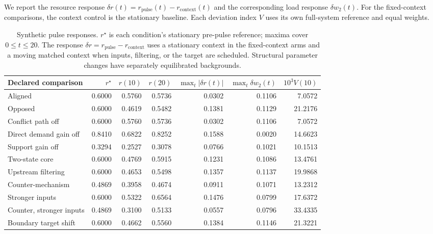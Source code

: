 We report the resource response $\delta r(t)=r_{\mathrm{pulse}}(t)-r_{\mathrm{context}}(t)$ and the corresponding load response $\delta w_2(t)$. For the fixed-context comparisons, the context control is the stationary baseline. Each deviation index $V$ uses its own full-system reference and equal weights.

\begin{table}[H]\centering\footnotesize

\begin{tabularx}{\textwidth}{@{}Yrrrrrr@{}}\toprule

Declared comparison & $r^\star$ & $r(10)$ & $r(20)$ & $\max_t|\delta r(t)|$ & $\max_t\delta w_2(t)$ & $10^3 V(10)$ \\\midrule

Aligned & 0.6000 & 0.5760 & 0.5736 & 0.0302 & 0.1106 & 7.0572 \\

Opposed & 0.6000 & 0.4619 & 0.5482 & 0.1381 & 0.1129 & 21.2176 \\

Conflict path off & 0.6000 & 0.5760 & 0.5736 & 0.0302 & 0.1106 & 7.0572 \\

Direct demand gain off & 0.8410 & 0.6822 & 0.8252 & 0.1588 & 0.0020 & 14.6623 \\

Support gain off & 0.3294 & 0.2527 & 0.3078 & 0.0766 & 0.1021 & 10.1513 \\

Two-state core & 0.6000 & 0.4769 & 0.5915 & 0.1231 & 0.1086 & 13.4761 \\

Upstream filtering & 0.6000 & 0.4653 & 0.5498 & 0.1357 & 0.1137 & 19.9868 \\

Counter-mechanism & 0.4869 & 0.3958 & 0.4674 & 0.0911 & 0.1071 & 13.2312 \\

Stronger inputs & 0.6000 & 0.5322 & 0.6564 & 0.1476 & 0.0799 & 17.6372 \\

Counter, stronger inputs & 0.4869 & 0.3100 & 0.5133 & 0.0557 & 0.0796 & 33.4335 \\

Boundary target shift & 0.6000 & 0.4662 & 0.5560 & 0.1384 & 0.1146 & 21.3221 \\

\bottomrule\end{tabularx}

\caption{Synthetic pulse responses. $r^\star$ is each condition's stationary pre-pulse reference; maxima cover $0\leq t\leq20$. The response $\delta r=r_{\mathrm{pulse}}-r_{\mathrm{context}}$ uses a stationary context in the fixed-context arms and a moving matched context when inputs, filtering, or the target are scheduled. Structural parameter changes have separately equilibrated backgrounds.}\label{tab:synthetic-results}\end{table}

